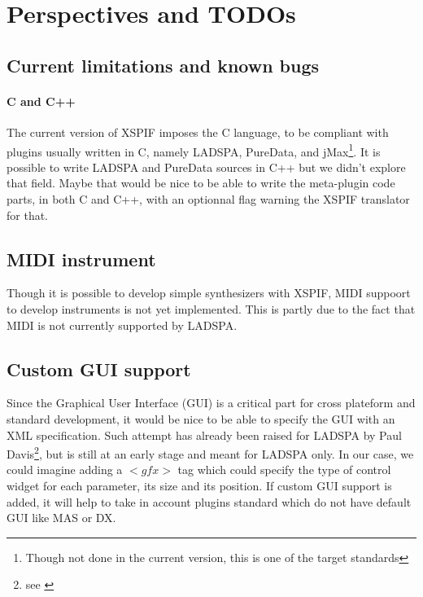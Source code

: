 
\chapter{Perspectives and TODOs}

\section{Current limitations and known bugs}
\subsubsection{C and C++}
\noindent The current version of XSPIF imposes the C language, to be compliant with plugins usually written in C, namely LADSPA, PureData, and jMax\footnote{Though not done in the current version, this is one of the target standards}. It is possible to write LADSPA and PureData sources in C++ but we didn't explore that field. Maybe that would be nice to be able to write the meta-plugin code parts, in both C and C++, with an optionnal flag warning the XSPIF translator for that.

\section{MIDI instrument}
\noindent Though it is possible to develop simple synthesizers with XSPIF, MIDI suppoort to develop instruments is not yet implemented. This is partly due to the fact that MIDI is not currently supported by LADSPA.

\section{Custom GUI support}
\noindent Since the Graphical User Interface (GUI) is a critical part for cross plateform and standard development, it would be nice to be able to specify the GUI with an XML specification. Such attempt has already been raised for LADSPA by Paul Davis\footnote{see \cite{LADSPA:site}}, but is still at an early stage and meant for LADSPA only. In our case, we could imagine adding a $<gfx>$ tag which could specify the type of control widget for each parameter, its size and its position. If custom GUI support is added, it will help to take in account plugins standard which do not have default GUI like MAS or DX.

